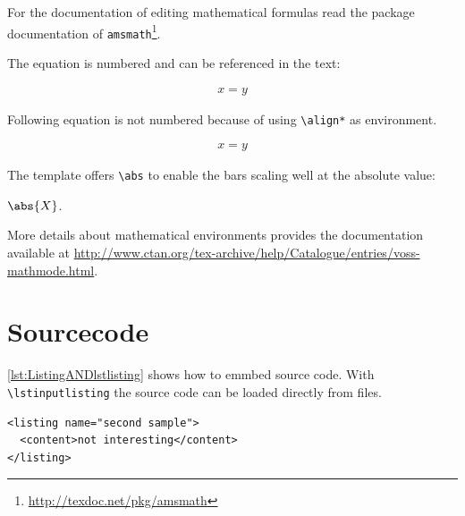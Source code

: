 For the documentation of editing mathematical formulas read the package documentation of \texttt{amsmath}\footnote{\url{http://texdoc.net/pkg/amsmath}}.

The equation is numbered and can be referenced in the text:
\begin{filecontents*}{\democodefile}
\begin{align}
  \label{eq:test}
  x = y
\end{align}
\end{filecontents*}

Following equation is not numbered because of using \texttt{\textbackslash align*} as environment.
\begin{filecontents*}{\democodefile}
\begin{align*}
  x = y
\end{align*}
\end{filecontents*}

The template offers \verb+\abs+ to enable the bars scaling well at the absolute value:

\begin{filecontents*}{\democodefile}
$\abs{X}$.
\end{filecontents*}

More details about mathematical environments provides the documentation available at \url{http://www.ctan.org/tex-archive/help/Catalogue/entries/voss-mathmode.html}.


\section{Sourcecode}
\autoref{lst:ListingANDlstlisting} shows how to emmbed source code.
With \texttt{\textbackslash lstinputlisting} the source code can be loaded directly from files.

\begin{Listing}
  \begin{lstlisting}
<listing name="second sample">
  <content>not interesting</content>
</listing>
\end{lstlisting}
  \caption{The code is separated by two horizontal lines in the listings environment.}
  \label{lst:ListingANDlstlisting}
\end{Listing}


